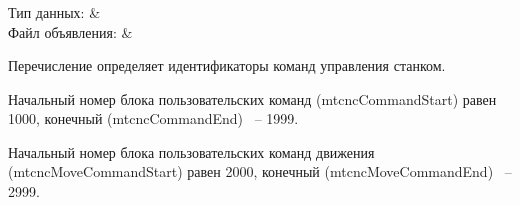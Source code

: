 \subsubsection{}
\label{sec:MTCNCRequests}

\begin{fHeader}
    Тип данных:            & \\
    Файл объявления:             &  \\
\end{fHeader}

Перечисление определяет идентификаторы команд управления станком. 

Начальный номер блока пользовательских команд  (mtcncCommandStart) равен 1000, конечный (mtcncCommandEnd) ~-- 1999. \killoverfullbefore

Начальный номер блока пользовательских команд движения (mtcncMoveCommandStart) равен 2000, конечный (mtcncMoveCommandEnd) ~-- 2999. \killoverfullbefore

